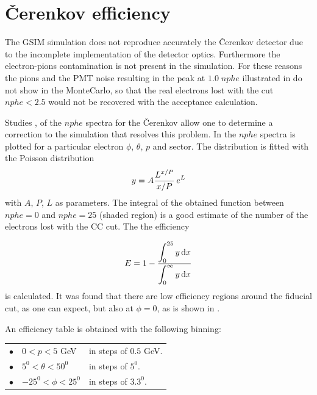 \cia\vspace{-2 cm}
\section{\v Cerenkov efficiency}
\label{sec:cc_eff}
The GSIM simulation does not reproduce accurately the \v Cerenkov detector due to the
incomplete implementation of the detector optics. Furthermore the electron-pions contamination
is not present in the simulation.
For these reasons the pions and the PMT noise resulting in the peak at $1.0\; nphe$ illustrated in 
do not show in the MonteCarlo, so that the real electrons lost with the cut $nphe < 2.5$ would not be recovered
with the acceptance calculation.

Studies \cite{bib:ludy}, \cite{bib:fid_e} of the $nphe$ spectra for the \v Cerenkov allow one
to determine a correction to the simulation that resolves this problem.
In  the $nphe$ spectra is plotted for a particular electron $\phi$, $\theta$, $p$ and sector.
The distribution is fitted with the Poisson distribution 
\begin{equation}
y = A \frac{\displaystyle L^{x/P}}{\displaystyle x/P}\,e^{L}
\end{equation}
with $A$, $P$, $L$ as parameters. The integral of the obtained function between $nphe =0$ and $nphe=25$ (shaded region) 
is a good estimate of the number of the electrons lost with the CC cut. The
the efficiency

\begin{equation}
E=1-\frac{\displaystyle \int_0^{25} y \, {\rm d}x}{\displaystyle \int_{0}^{\infty} y \, {\rm d}x}
\end{equation}
is calculated. 
It was found that there are low efficiency regions around the fiducial cut, as one can expect,
but also at $\phi=0$, as is shown in .



An efficiency table is obtained with the following binning:
\vspace{0.4 cm}

\begin{table}[h]
\begin{center}
  \begin{tabular}{l l l}
$\bullet$ & $0<p<5$ GeV         & in steps of $0.5$ GeV. \\
$\bullet$ & $ 5^0<\theta<50^0$  & in steps of $5^0$. \\
$\bullet$ & $-25^0<\phi<25^0$ & in steps of $3.3^0$. \\

  \end{tabular}
 \end{center}
\end{table}


